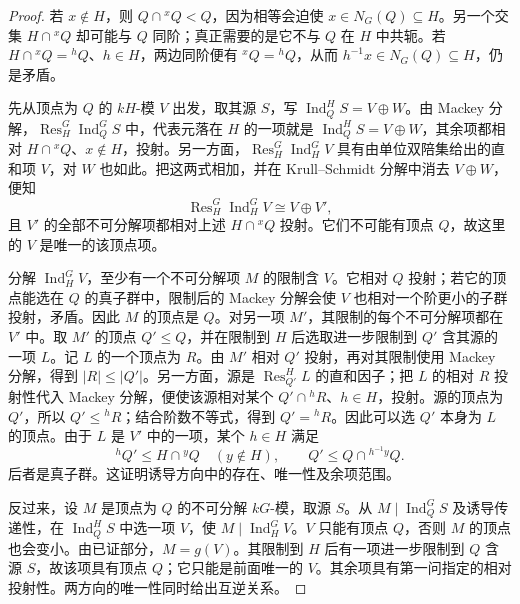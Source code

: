\begin{proof}
	若 \(x\notin H\)，则 \(Q\cap{}^xQ<Q\)，因为相等会迫使 \(x\in N_G(Q)\subseteq H\)。另一个交集 \(H\cap{}^xQ\) 却可能与 \(Q\) 同阶；真正需要的是它不与 \(Q\) 在 \(H\) 中共轭。若 \(H\cap{}^xQ={}^hQ\)、\(h\in H\)，两边同阶便有 \({}^xQ={}^hQ\)，从而 \(h^{-1}x\in N_G(Q)\subseteq H\)，仍是矛盾。

	先从顶点为 \(Q\) 的 \(kH\)-模 \(V\) 出发，取其源 \(S\)，写 \(\operatorname{Ind}_Q^H S=V\oplus W\)。由 Mackey 分解，\(\operatorname{Res}_H^G\operatorname{Ind}_Q^G S\) 中，代表元落在 \(H\) 的一项就是 \(\operatorname{Ind}_Q^H S=V\oplus W\)，其余项都相对 \(H\cap{}^xQ\)、\(x\notin H\)，投射。另一方面，\(\operatorname{Res}_H^G\operatorname{Ind}_H^G V\) 具有由单位双陪集给出的直和项 \(V\)，对 \(W\) 也如此。把这两式相加，并在 Krull--Schmidt 分解中消去 \(V\oplus W\)，便知
	\[
		\operatorname{Res}_H^G\operatorname{Ind}_H^G V\cong V\oplus V',
	\]
	且 \(V'\) 的全部不可分解项都相对上述 \(H\cap{}^xQ\) 投射。它们不可能有顶点 \(Q\)，故这里的 \(V\) 是唯一的该顶点项。

	分解 \(\operatorname{Ind}_H^G V\)，至少有一个不可分解项 \(M\) 的限制含 \(V\)。它相对 \(Q\) 投射；若它的顶点能选在 \(Q\) 的真子群中，限制后的 Mackey 分解会使 \(V\) 也相对一个阶更小的子群投射，矛盾。因此 \(M\) 的顶点是 \(Q\)。对另一项 \(M'\)，其限制的每个不可分解项都在 \(V'\) 中。取 \(M'\) 的顶点 \(Q'\le Q\)，并在限制到 \(H\) 后选取进一步限制到 \(Q'\) 含其源的一项 \(L\)。记 \(L\) 的一个顶点为 \(R\)。由 \(M'\) 相对 \(Q'\) 投射，再对其限制使用 Mackey 分解，得到 \(|R|\le|Q'|\)。另一方面，源是 \(\operatorname{Res}_{Q'}^H L\) 的直和因子；把 \(L\) 的相对 \(R\) 投射性代入 Mackey 分解，便使该源相对某个 \(Q'\cap{}^hR\)、\(h\in H\)，投射。源的顶点为 \(Q'\)，所以 \(Q'\le{}^hR\)；结合阶数不等式，得到 \(Q'={}^hR\)。因此可以选 \(Q'\) 本身为 \(L\) 的顶点。由于 \(L\) 是 \(V'\) 中的一项，某个 \(h\in H\) 满足
	\[
		{}^hQ'\le H\cap{}^yQ\quad(y\notin H),\qquad
		Q'\le Q\cap{}^{h^{-1}y}Q.
	\]
	后者是真子群。这证明诱导方向中的存在、唯一性及余项范围。

	反过来，设 \(M\) 是顶点为 \(Q\) 的不可分解 \(kG\)-模，取源 \(S\)。从 \(M\mid\operatorname{Ind}_Q^G S\) 及诱导传递性，在 \(\operatorname{Ind}_Q^H S\) 中选一项 \(V\)，使 \(M\mid\operatorname{Ind}_H^G V\)。\(V\) 只能有顶点 \(Q\)，否则 \(M\) 的顶点也会变小。由已证部分，\(M=g(V)\)。其限制到 \(H\) 后有一项进一步限制到 \(Q\) 含源 \(S\)，故该项具有顶点 \(Q\)；它只能是前面唯一的 \(V\)。其余项具有第一问指定的相对投射性。两方向的唯一性同时给出互逆关系。
\end{proof}

